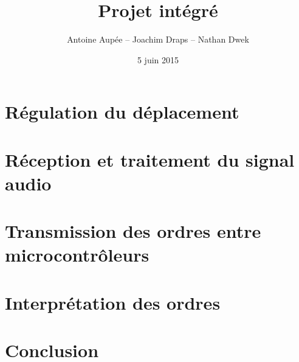 \documentclass[frenchb,14pt]{beamer}
\title{Projet intégré}
\author{Antoine Aupée -- Joachim Draps -- Nathan Dwek}
\date{5 juin 2015}
\begin{document}
\frame{\titlepage}


\section{Régulation du déplacement}

\section{Réception et traitement du signal audio}
%
\section{Transmission des ordres entre microcontrôleurs}
%
\section{Interprétation des ordres}
%
\section{Conclusion}

\end{document}
